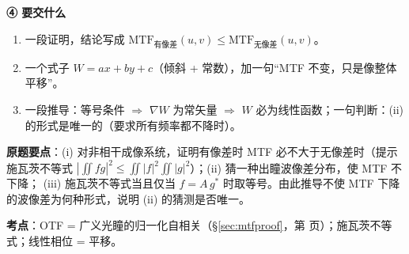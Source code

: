 \begin{idea}[读题：这道题在说什么]
\textbf{④ 要交什么}
\begin{enumerate}[label=(\roman*)]
\item 一段证明，结论写成 $\mathrm{MTF}_{\text{有像差}}(u,v)\le\mathrm{MTF}_{\text{无像差}}(u,v)$。
\item 一个式子 $W=ax+by+c$（倾斜 + 常数），加一句“MTF 不变，只是像整体平移”。
\item 一段推导：等号条件 $\Rightarrow$ $\nabla W$ 为常矢量 $\Rightarrow$ $W$ 必为线性函数；一句判断：(ii) 的形式是唯一的（要求所有频率都不降时）。
\end{enumerate}
\end{idea}

\noindent\textbf{原题要点}：(i) 对非相干成像系统，证明有像差时 MTF 必不大于无像差时（提示施瓦茨不等式
$\left|\iint fg\right|^2\le\iint|f|^2\iint|g|^2$）；(ii) 猜一种出瞳波像差分布，使 MTF 不下降；
(iii) 施瓦茨不等式当且仅当 $f=A\,g^*$ 时取等号。由此推导不使 MTF 下降的波像差为何种形式，说明 (ii) 的猜测是否唯一。

\textbf{考点}：OTF = 广义光瞳的归一化自相关（§\ref{sec:mtfproof}，第 \pageref{sec:mtfproof} 页）；施瓦茨不等式；线性相位 = 平移。


